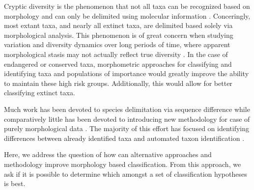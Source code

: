 \documentclass[12pt,letterpaper]{article}\usepackage{graphicx, color}
\renewcommand{\section}[1]{%
\bigskip
\begin{center}
\begin{Large}
\normalfont\scshape #1
\medskip
\end{Large}
\end{center}}
\begin{document}

Cryptic diversity is the phenomenon that not all taxa can be recognized based on morphology and can only be delimited using molecular information \citep{Stuart2006,Pfenninger2007,Funk2012,Clare2011}. Conceringly, most extant taxa, and nearly all extinct taxa, are delimited based solely via morphological analysis. This phenomenon is of great concern when studying variation and diversity dynamics over long periods of time, where apparent morphological stasis may not actually reflect true diversity \citep{Hunt2008,Eldredge1972,Gould1977a}. In the case of endangered or conserved taxa, morphometric approaches for classifying and identifying taxa and populations of importance would greatly improve the ability to maintain these high risk groups. Additionally, this would allow for better classifying extinct taxa.

Much work has been devoted to species delimitation via sequence difference \citep{Fujita2012,Yang2010b} while comparatively little has been devoted to introducing new methodology for case of purely morphological data \citep{Mitteroecker2011,Zelditch2004}. The majority of this effort has focused on identifying differences between already identified taxa \citep{Polly2007a,Demandt2009,Gaubert2005b,Gunduz2007,Polly2003,Zelditch2004} and automated taxon identification \citep{MacLeod2007}.

Here, we address the question of how can alternative approaches and methodology improve morphology based classification. From this approach, we ask if it is possible to determine which amongst a set of classification hypotheses is best.

\end{document}

